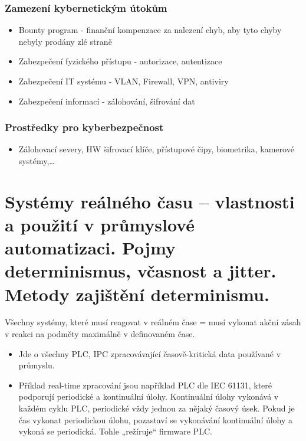 \subsubsection*{Zamezení kybernetickým útokům}
\begin{itemize}
  \item Bounty program - finanční kompenzace za nalezení chyb, aby tyto chyby nebyly prodány zlé straně
  \item Zabezpečení fyzického přístupu - autorizace, autentizace
  \item Zabezpečení IT systému - VLAN, Firewall, VPN, antiviry
  \item Zabezpečení informací - zálohování, šifrování dat
\end{itemize}

\subsubsection*{Prostředky pro kyberbezpečnost}
\begin{itemize}
  \item Zálohovací severy, HW šifrovací klíče, přístupové čipy, biometrika, kamerové systémy,\dots
\end{itemize}

\section{Systémy reálného času – vlastnosti a použití v průmyslové automatizaci. Pojmy determinismus, včasnost a jitter. Metody zajištění determinismu.}
Všechny systémy, které musí reagovat v reálném čase = musí vykonat akční zásah v reakci na podměty maximálně v definovaném čase.
\begin{itemize}
  \item Jde o všechny PLC, IPC zpracovávající časově-kritická data používané v průmyslu.
  \item Příklad real-time zpracování jsou například PLC dle IEC 61131, které podporují periodické a kontinuální úlohy. Kontinuální úlohy vykonává v každém cyklu PLC, periodické vždy jednou za nějaký časový úsek. Pokud je čas vykonat periodickou úlohu, pozastaví se vykonávání kontinuální úlohy a vykoná se periodická. Tohle „režíruje“ firmware PLC.
\end{itemize}

